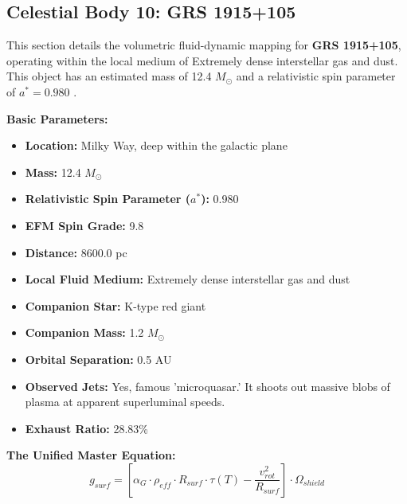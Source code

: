 \documentclass[11pt, a4paper]{article}
\begin{document}
\clearpage
\subsection{Celestial Body 10: GRS 1915+105}
This section details the volumetric fluid-dynamic mapping for \textbf{GRS 1915+105}, operating within the local medium of Extremely dense interstellar gas and dust. This object has an estimated mass of 12.4 $M_{\odot}$ and a relativistic spin parameter of $a^* = 0.980$ \cite{mirabel1994, simbad}.

\vspace{0.5em}
\noindent \textbf{Basic Parameters:}
\begin{itemize}
  \item \textbf{Location:} Milky Way, deep within the galactic plane
  \item \textbf{Mass:} 12.4 $M_{\odot}$
  \item \textbf{Relativistic Spin Parameter ($a^*$):} 0.980
  \item \textbf{EFM Spin Grade:} 9.8
  \item \textbf{Distance:} 8600.0 pc
  \item \textbf{Local Fluid Medium:} Extremely dense interstellar gas and dust
  \item \textbf{Companion Star:} K-type red giant
  \item \textbf{Companion Mass:} 1.2 $M_{\odot}$
  \item \textbf{Orbital Separation:} 0.5 AU
  \item \textbf{Observed Jets:} Yes, famous 'microquasar.' It shoots out massive blobs of plasma at apparent superluminal speeds.
  \item \textbf{Exhaust Ratio:} 28.83\%
\end{itemize}

\vspace{0.5em}
\noindent \textbf{The Unified Master Equation:}
$$ g_{surf} = \left[ \alpha_G \cdot \rho_{eff} \cdot R_{surf} \cdot \tau(T) - \frac{v_{rot}^2}{R_{surf}} \right] \cdot \Omega_{shield} $$
\end{document}
